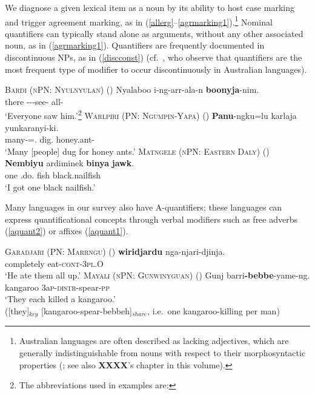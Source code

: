 \documentclass[12pt,egregdoesnotlikesansseriftitles]{scrartcl}
\begin{document}
We diagnose a given lexical item as a noun by its ability to host case marking and trigger agreement marking, as in (\ref{allerg}--\ref{agrmarking1}).\footnote{Australian languages are often described as lacking adjectives, which are generally indistinguishable from nouns with respect to their morphosyntactic properties (\citealt[67--68]{dixon02}; see also {\bf XXXX}'s chapter in this volume).}  Nominal quantifiers can typically stand alone as arguments, without any other associated noun, as in (\ref{agrmarking1}). Quantifiers are frequently documented in discontinuous NPs, as in (\ref{discconst}) (cf.\ \citealt[51--52]{louagieverstraete16}, who observe that quantifiers are the most frequent type of modifier to occur discontinuously in Australian languages). 

\begin{exe}
  \ex\label{allerg} \textsc{Bardi (nPN: Nyulnyulan)} (\citealt[272]{bowern12})
  \gll Nyalaboo i-ng-arr-ala-n \textbf{boonyja}-nim.\\
  there \Third-\Pst-\Aug-see-\Rempst{} all-\Erg\\
  \glt `Everyone saw him.'\footnote{The abbreviations used in examples are: \printglossary[style=inline,type=\leipzigtype]}
  \ex \textsc{Warlpiri (PN: Ngumpin-Yapa)} (\citealt[6]{bowler17})
  \gll \textbf{Panu}-ngku=lu karlaja yunkaranyi-ki.\\
  many-\Erg=\Tpl.\Sarg{} dig.\Pst{} honey.ant-\Dat\\
  \glt `Many [people] dug for honey ants.' \label{agrmarking1}
  \ex \textsc{Matngele (nPN: Eastern Daly)} (\citealt[54]{zandvoort99})
  \gll \textbf{Nembiyu} ardiminek \textbf{binya} \textbf{jawk}.\\
  one \First\Min\Sarg.do.\Pst{} fish black.nailfish\\
  \glt `I got one black nailfish.'  \label{discconst}
\end{exe}


Many languages in our survey also have A-quantifiers; these languages can express quantificational concepts through verbal modifiers such as free adverbs (\ref{aquant2}) or affixes (\ref{aquant1}).
\begin{exe}
  \ex  \textsc{Garadjari (PN: Marrngu)} (\citealt[54]{sands89})
  \gll \textbf{wiridjardu}  nga-njari-djinja.\\
  completely  eat-\textsc{cont}-3\textsc{pl.O}\\
  \glt `He ate them all up.' \label{aquant2}
  \ex \textsc{Mayali (nPN: Gunwinyguan)} (\citealt[221]{evans95})
  \gll Gunj barri\textbf{-bebbe}-yame-ng.\\
  kangaroo 3a\textsc{p-distr}-spear-\textsc{pp}\\
  \glt `They each killed a kangaroo.'\\
  ([they]$_{key}$ [kangaroo-spear-bebbeh]$_{share}$, i.e.\ one kangaroo-killing per man) \label{aquant1}
\end{exe}
\end{document}
